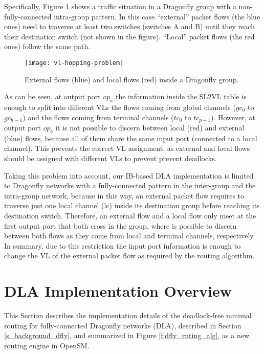 \documentclass[review]{elsarticle}
\newcommand{\dfly}{Dragonfly}
\newcommand{\ib}{IB}
\begin{document}
Specifically, Figure \ref{f:vl-hopping-problem} shows a traffic situation in a \dfly{} group with a non-fully-connected intra-group pattern.
In this case ``external'' packet flows (the blue ones) need to traverse at least two switches (switches A and B) until they
reach their destination switch (not shown in the figure). ``Local'' packet flows (the red ones) follow the same path.

\begin{figure}[!htb]
	\centering
	\texttt{[image: vl-hopping-problem]}
	\caption{External flows (blue) and local flows (red) inside a \dfly{} group.}
	\label{f:vl-hopping-problem}
\end{figure}

As can be seen, at output port \emph{$op_a$} the information inside the SL2VL table is enough to split into different VLs the flows coming from global channels ($gc_0$ to $gc_{h-1}$)
and the flows coming from terminal channels ($tc_0$ to $tc_{p-1}$).
However, at output port \emph{$op_b$} it is not possible to discern between local (red) and external (blue) flows, because all of them share the same input port (connected to a local channel).
This prevents the correct VL assignment, as external and local flows should be assigned with different VLs to prevent prevent deadlocks.

Taking this problem into account, our \ib-based DLA implementation is limited to \dfly{} networks with a fully-connected pattern in the inter-group and the intra-group network,
because in this way, an external packet flow requires to traverse just one  local channel (lc) inside its destination group before reaching its destination switch.
Therefore, an external flow and a local flow only meet at the first output port that both cross in the group, where is possible to discern between both
flows as they come from local and terminal channels, respectively.
In summary, due to this restriction the input port information is enough to change the VL of the external packet flow as required by the routing algorithm.


\section{DLA Implementation Overview}
\label{s_implementation}

This Section describes the implementation details of the deadlock-free minimal routing for fully-connected \dfly{} networks (DLA),
described in Section \ref{s_background_dfly}, and summarized in Figure \ref{f:dfly_ruting_alg},
as a new routing engine in OpenSM.
\end{document}

